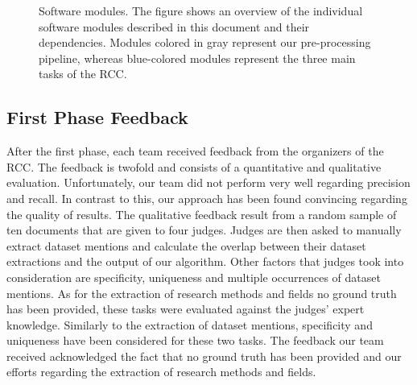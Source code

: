 




\begin{figure}[t]
    \centering
    \resizebox{!}{7cm}{}
    \caption{Software modules. The figure shows an overview of the individual software modules described in this document and their dependencies. Modules colored in gray represent our pre-processing pipeline, whereas blue-colored modules represent the three main tasks of the RCC.}
    \label{figure:pipeline}
\end{figure}

\subsection{First Phase Feedback}
After the first phase, each team received feedback from the organizers of the RCC.
The feedback is twofold and consists of a quantitative and qualitative evaluation. Unfortunately, our team did not perform very well regarding precision and recall. In contrast to this, our approach has been found convincing regarding the quality of results. The qualitative feedback result from a random sample of ten documents that are given to four judges.
Judges are then asked to manually extract dataset mentions and calculate the overlap between their dataset extractions and the output of our algorithm.
Other factors that judges took into consideration are specificity, uniqueness and multiple occurrences of dataset mentions.
As for the extraction of research methods and fields no ground truth has been provided, these tasks were evaluated against the judges' expert knowledge.
Similarly to the extraction of dataset mentions, specificity and uniqueness have been considered for these two tasks.
The feedback our team received acknowledged the fact that no ground truth has been provided and our efforts regarding the extraction of research methods and fields.

